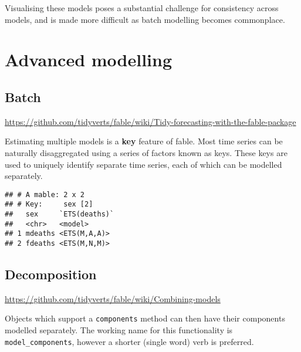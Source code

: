 \documentclass[]{book}
\newenvironment{Shaded}{\begin{snugshade}}{\end{snugshade}}
\newcommand{\KeywordTok}[1]{\textcolor[rgb]{0.13,0.29,0.53}{\textbf{#1}}}
\newcommand{\NormalTok}[1]{#1}
\newcommand{\OperatorTok}[1]{\textcolor[rgb]{0.81,0.36,0.00}{\textbf{#1}}}
\newcommand{\StringTok}[1]{\textcolor[rgb]{0.31,0.60,0.02}{#1}}
\begin{document}
Visualising these models poses a substantial challenge for consistency across models, and is made more difficult as batch modelling becomes commonplace.

\hypertarget{advanced}{%
\chapter{Advanced modelling}\label{advanced}}

\hypertarget{batch}{%
\section{Batch}\label{batch}}

\url{https://github.com/tidyverts/fable/wiki/Tidy-forecasting-with-the-fable-package}

Estimating multiple models is a \textbf{key} feature of fable. Most time series can be naturally disaggregated using a series of factors known as keys. These keys are used to uniquely identify separate time series, each of which can be modelled separately.

\begin{Shaded}
\end{Shaded}

\begin{verbatim}
## # A mable: 2 x 2
## # Key:     sex [2]
##   sex     `ETS(deaths)`
##   <chr>   <model>      
## 1 mdeaths <ETS(M,A,A)> 
## 2 fdeaths <ETS(M,N,M)>
\end{verbatim}

\hypertarget{decomposition}{%
\section{Decomposition}\label{decomposition}}

\url{https://github.com/tidyverts/fable/wiki/Combining-models}

Objects which support a \texttt{components} method can then have their components modelled separately. The working name for this functionality is \texttt{model\_components}, however a shorter (single word) verb is preferred.
\end{document}
